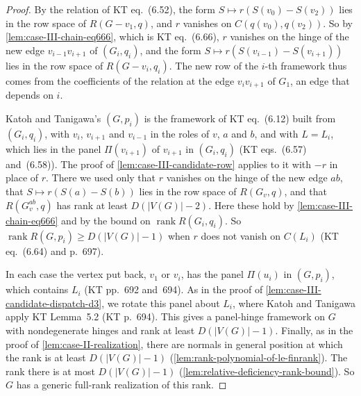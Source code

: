 \begin{proof}
  By the relation of KT eq.~(6.52), the form
  $S \mapsto r(S(v_0) - S(v_2))$ lies in the row space of
  $R(G - v_1, q)$, and $r$ vanishes on $C(q(v_0), q(v_2))$. So by
  \cref{lem:case-III-chain-eq666}, which is KT eq.~(6.66), $r$ vanishes
  on the hinge of the new edge $v_{i-1} v_{i+1}$ of $(G_i, q_i)$, and the
  form $S \mapsto r(S(v_{i-1}) - S(v_{i+1}))$ lies in the row space of
  $R(G - v_i, q_i)$. The new row of the $i$-th framework thus comes from
  the coefficients of the relation at the edge $v_i v_{i+1}$ of $G_1$, an
  edge that depends on $i$.

  Katoh and Tanigawa's $(G, p_i)$ is the framework of KT eq.~(6.12)
  built from $(G_i, q_i)$, with $v_i$, $v_{i+1}$ and $v_{i-1}$ in the
  roles of $v$, $a$ and $b$, and with $L = L_i$, which lies in the panel
  $\Pi(v_{i+1})$ of $v_{i+1}$ in $(G_i, q_i)$ (KT eqs.~(6.57)
  and~(6.58)). The proof of \cref{lem:case-III-candidate-row} applies to
  it with $-r$ in place of $r$. There we used only that $r$ vanishes on
  the hinge of the new edge $ab$, that $S \mapsto r(S(a) - S(b))$ lies in
  the row space of $R(G_v, q)$, and that $R(G_v^{ab}, q)$ has rank at
  least $D(|V(G)| - 2)$. Here these hold by
  \cref{lem:case-III-chain-eq666} and by the bound on
  $\operatorname{rank} R(G_i, q_i)$. So $\operatorname{rank} R(G, p_i) \ge
  D(|V(G)| - 1)$ when $r$ does not vanish on $C(L_i)$ (KT eq.~(6.64)
  and p.~697).

  In each case the vertex put back, $v_1$ or $v_i$, has the panel
  $\Pi(u_i)$ in $(G, p_i)$, which contains $L_i$ (KT pp.~692 and~694).
  As in the proof of \cref{lem:case-III-candidate-dispatch-d3}, we
  rotate this panel about $L_i$, where Katoh and Tanigawa apply KT
  Lemma~5.2 (KT p.~694).
  This gives a panel-hinge framework on $G$ with nondegenerate hinges
  and rank at least $D(|V(G)| - 1)$. Finally, as in the proof of
  \cref{lem:case-II-realization}, there are normals in general position
  at which the rank is at least $D(|V(G)| - 1)$
  (\cref{lem:rank-polynomial-of-le-finrank}). The rank there is at most
  $D(|V(G)| - 1)$ (\cref{lem:relative-deficiency-rank-bound}). So $G$
  has a generic full-rank realization of this rank.
\end{proof}

